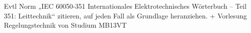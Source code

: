 


Evtl Norm „IEC 60050-351 Internationales Elektrotechnisches Wörterbuch – Teil 351: Leittechnik“ zitieren, auf jeden Fall als Grundlage heranziehen.
+ Vorlesung Regelungstechnik von Studium MB13VT




























